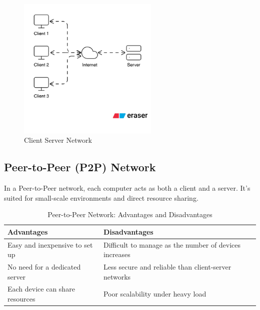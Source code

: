 \begin{figure}[H]
    \centering
    \includegraphics[width=0.6\textwidth]{images/chapter2/client-server.png}
    \caption{Client Server Network}
    \label{fig:client-server}
\end{figure}


\subsection{Peer-to-Peer (P2P) Network}
In a Peer-to-Peer network, each computer acts as both a client and a server. It's suited for small-scale environments and direct resource sharing.

\begin{table}[H]
\centering
\caption{Peer-to-Peer Network: Advantages and Disadvantages}
\begin{tabularx}{\linewidth}{|X|X|}
\hline
\textbf{Advantages} & \textbf{Disadvantages} \\
\hline
Easy and inexpensive to set up & Difficult to manage as the number of devices increases \\
\hline
No need for a dedicated server & Less secure and reliable than client-server networks \\
\hline
Each device can share resources & Poor scalability under heavy load \\
\hline
\end{tabularx}
\end{table}


